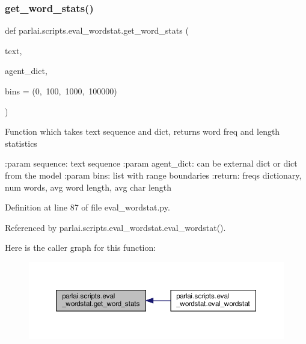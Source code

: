 \subsubsection{\texorpdfstring{get\+\_\+word\+\_\+stats()}{get\_word\_stats()}}
{\footnotesize\ttfamily def parlai.\+scripts.\+eval\+\_\+wordstat.\+get\+\_\+word\+\_\+stats (\begin{DoxyParamCaption}\item[{}]{text,  }\item[{}]{agent\+\_\+dict,  }\item[{}]{bins = {\ttfamily (0,~100,~1000,~100000)} }\end{DoxyParamCaption})}

\begin{DoxyVerb}Function which takes text sequence and dict, returns word freq and length statistics

:param sequence: text sequence
:param agent_dict: can be external dict or dict from the model
:param bins: list with range boundaries
:return: freqs dictionary, num words, avg word length, avg char length
\end{DoxyVerb}
 

Definition at line 87 of file eval\+\_\+wordstat.\+py.



Referenced by parlai.\+scripts.\+eval\+\_\+wordstat.\+eval\+\_\+wordstat().

Here is the caller graph for this function\+:
\nopagebreak
\begin{figure}[H]
\begin{center}
\leavevmode
\includegraphics[width=350pt]{namespaceparlai_1_1scripts_1_1eval__wordstat_ab2d96b5ac07c988934a0320739fc3c60_icgraph}
\end{center}
\end{figure}
\mbox{\label{namespaceparlai_1_1scripts_1_1eval__wordstat_af41cd95533433b93e7383bc6dab04963}} 

